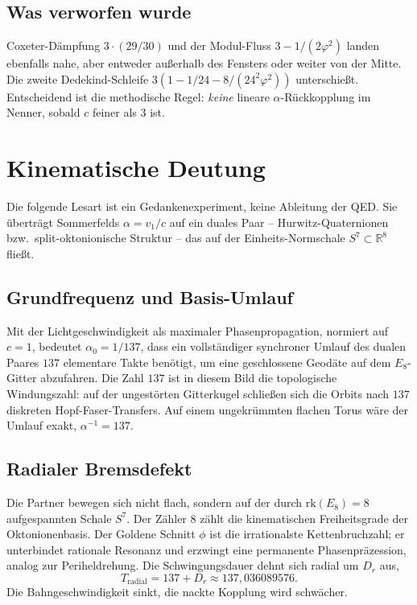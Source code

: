 \documentclass[11pt,a4paper]{article}
\begin{document}
\subsection{Was verworfen wurde}
Coxeter-Dämpfung $3\cdot(29/30)$ und der Modul-Fluss $3-1/(2\varphi^2)$ landen ebenfalls nahe, aber entweder außerhalb des Fensters oder weiter von der Mitte.
Die zweite Dedekind-Schleife $3(1-1/24-8/(24^2\varphi^2))$ unterschießt.
Entscheidend ist die methodische Regel: \emph{keine} lineare $\alpha$-Rückkopplung im Nenner, sobald $c$ feiner als $3$ ist.

\section{Kinematische Deutung}

Die folgende Lesart ist ein Gedankenexperiment, keine Ableitung der QED.
Sie überträgt Sommerfelds $\alpha=v_1/c$ auf ein duales Paar -- Hurwitz-Quaternionen bzw.\ split-oktonionische Struktur -- das auf der Einheits-Normschale $S^7\subset\mathbb{R}^8$ fließt.

\subsection{Grundfrequenz und Basis-Umlauf}
Mit der Lichtgeschwindigkeit als maximaler Phasenpropagation, normiert auf $c=1$, bedeutet $\alpha_0=1/137$, dass ein vollständiger synchroner Umlauf des dualen Paares $137$ elementare Takte benötigt, um eine geschlossene Geodäte auf dem $E_8$-Gitter abzufahren.
Die Zahl $137$ ist in diesem Bild die topologische Windungszahl: auf der ungestörten Gitterkugel schließen sich die Orbits nach $137$ diskreten Hopf-Faser-Transfers.
Auf einem ungekrümmten flachen Torus wäre der Umlauf exakt, $\alpha^{-1}=137$.

\subsection{Radialer Bremsdefekt}
Die Partner bewegen sich nicht flach, sondern auf der durch $\mathrm{rk}(E_8)=8$ aufgespannten Schale $S^7$.
Der Zähler $8$ zählt die kinematischen Freiheitsgrade der Oktonionenbasis.
Der Goldene Schnitt $\phi$ ist die irrationalste Kettenbruchzahl; er unterbindet rationale Resonanz und erzwingt eine permanente Phasenpräzession, analog zur Periheldrehung.
Die Schwingungsdauer dehnt sich radial um $D_r$ aus,
\begin{equation}
T_{\mathrm{radial}}=137+D_r\approx 137{,}036089576.
\end{equation}
Die Bahngeschwindigkeit sinkt, die nackte Kopplung wird schwächer.
\end{document}
